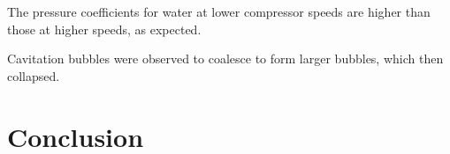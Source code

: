 \documentclass{article}
\begin{document}
The pressure coefficients for water at lower compressor speeds are higher than those at higher speeds, as expected.




Cavitation bubbles were observed to coalesce to form larger bubbles, which then collapsed.




\section{Conclusion}
\end{document}
